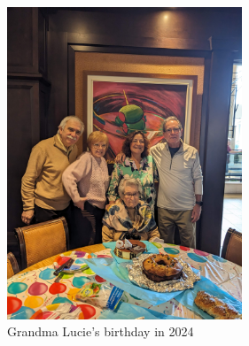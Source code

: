 \begin{figure}
  \includegraphics[width=70mm]{dermardiros/images/Ciambalone.jpg}
    \caption{Grandma Lucie's birthday in 2024}
\end{figure}
